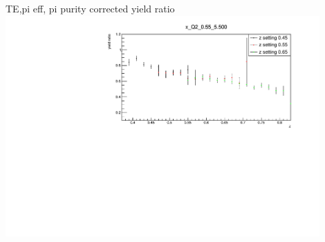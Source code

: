 \begin{frame}{TE,pi eff, pi purity corrected yield ratio}
\includegraphics[width = 0.9\textwidth]{results/yield/statistics_corr/x_Q2_0.55_5.500_ratio.pdf}
\end{frame}
